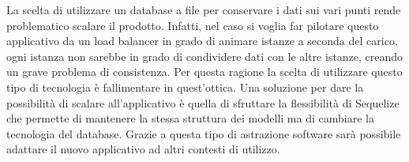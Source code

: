 \vspace{5mm}La scelta di utilizzare un database a file per conservare i dati sui vari punti rende problematico scalare il prodotto. Infatti, nel caso si voglia far pilotare questo applicativo da un load balancer\cite{LoadBalancing} in grado di animare istanze a seconda del carico, ogni istanza non sarebbe in grado di condividere dati con le altre istanze, creando un grave problema di consistenza. Per questa ragione la scelta di utilizzare questo tipo di tecnologia è fallimentare in quest'ottica. Una soluzione per dare la possibilità di scalare all'applicativo è quella di sfruttare la flessibilità di Sequelize\cite{Sequelize} che permette di mantenere la stessa struttura dei modelli ma di cambiare la tecnologia del database. Grazie a questa tipo di astrazione software sarà possibile adattare il nuovo applicativo ad altri contesti di utilizzo.









